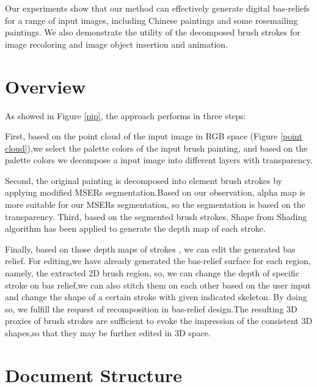 Our experiments show that our method can effectively generate digital bas-reliefs for a range of input images, including Chinese paintings and some rosemailing paintings. 
We also demonstrate the utility of the decomposed brush strokes for image recoloring and image object insertion and animation.

\section{Overview}  As showed in Figure \ref{pip}, the approach performs in three steps:

First, based on the point cloud of the input image in RGB space (Figure \ref{point cloud}),we select the palette colors of the input brush painting, and based on the palette colors we decompose a input image into different layers with transparency.  

Second,  the original painting is decomposed into element brush strokes by applying modified MSERs segmentation.Based on our observation, alpha map is more suitable for our MSERs segmentation, so the segmentation is based on the transparency. Third, based on the segmented brush strokes,  Shape from Shading algorithm has been applied to generate the depth map of each stroke.  

Finally, based on those depth maps of strokes , we can edit the generated bas relief. For editing,we have already generated the bas-relief surface for each region, namely, the extracted 2D brush region, so, we can change the depth of specific stroke on bas relief,we can also stitch them on each other based on the user input and change the shape of a certain stroke with given indicated skeleton. By doing so, we fulfill the request of recomposition in bas-relief design.The resulting 3D proxies of brush strokes are sufficient to evoke the impression of the consistent 3D shapes,so that they may be further edited in 3D space. 



\section{Document Structure}


\newpage
